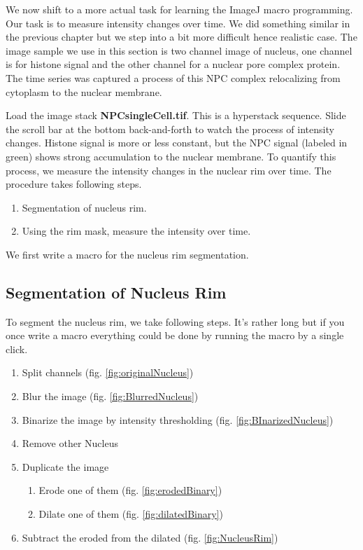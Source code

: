 We now shift to a more actual task for learning the ImageJ macro programming. Our task is to measure intensity changes over time. We did something similar in the previous chapter but we step into a bit more difficult hence realistic case. The image sample we use in this section is two channel image of nucleus, one channel is for histone signal and the other channel for a nuclear pore complex protein. The time series was captured a process of this NPC complex relocalizing from cytoplasm to the nuclear membrane. 

Load the image stack \textbf{NPCsingleCell.tif}. This is a hyperstack sequence. Slide the scroll bar at the bottom back-and-forth to watch the process of intensity changes. Histone signal is more or less constant, but the NPC signal (labeled in green) shows strong accumulation to the nuclear membrane. To quantify this process, we measure the intensity changes in the nuclear rim over time. The procedure takes following steps. 
\begin{enumerate}
    \item Segmentation of nucleus rim.
    \item Using the rim mask, measure the intensity over time. 
\end{enumerate}

We first write a macro for the nucleus rim segmentation. 

\subsection{Segmentation of Nucleus Rim}

To segment the nucleus rim, we take following steps. It's rather long but if you once write a macro everything could be done by running the macro by a single click. 

\begin{enumerate}
  \item Split channels (fig. \ref{fig:originalNucleus})
    \item Blur the image (fig. \ref{fig:BlurredNucleus})
    \item Binarize the image by intensity thresholding (fig. \ref{fig:BInarizedNucleus})
    \item Remove other Nucleus
    \item Duplicate the image
    \begin{enumerate}
        \item Erode one of them (fig. \ref{fig:erodedBinary})

        \item Dilate one of them (fig. \ref{fig:dilatedBinary})

    \end{enumerate}
    \item Subtract the eroded from the dilated (fig. \ref{fig:NucleusRim})

\end{enumerate}

